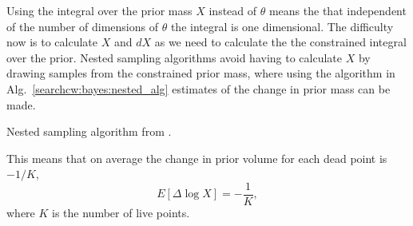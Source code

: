 Using the integral over the prior mass $X$ instead of $\theta$ means the that independent of the number of dimensions of $\theta$ the integral is one dimensional.
The difficulty now is to calculate $X$ and $dX$ as we need to calculate the the constrained integral over the prior.
Nested sampling algorithms avoid having to calculate $X$ by drawing samples from the constrained prior mass, where using the algorithm in Alg.~\ref{searchcw:bayes:nested_alg} estimates of the change in prior mass can be made.
%
\begin{algorithm}
	\centering
	\begin{algorithmic}[1]
		 
		
		
		 
		 
		\ENDWHILE
		
			 
			 
		\ENDWHILE
		\STATE
		
	\end{algorithmic}
	\caption[Nested sampling algorithm]{ Nested sampling algorithm from \citep{speagle2019DynestyDynamic}. \label{searchcw:bayes:nested_alg}}
\end{algorithm}
%
This means that on average the change in prior volume for each dead point is $-1/K$,
\begin{equation}
\label{searchcw:bayes:nested:exp}
	E[ \Delta \log X] = - \frac{1}{K},
\end{equation}
where $K$ is the number of live points.

